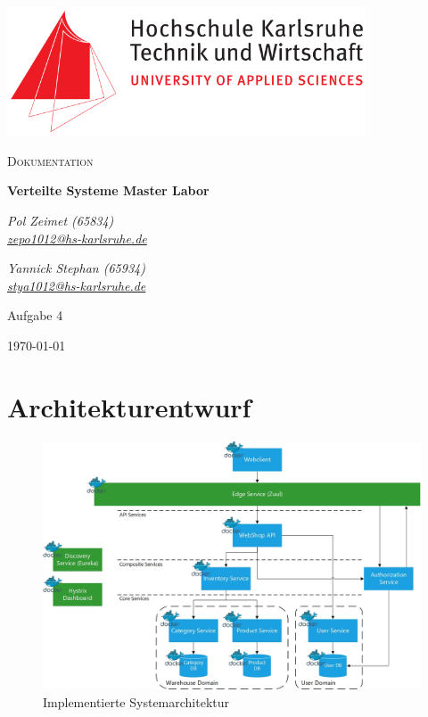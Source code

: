 \documentclass[12pt,a4paper]{article}
\begin{document}
	\begin{titlepage}
		\centering
		\includegraphics[width=0.8\textwidth]{img/Hska_logo.png}\par\vspace{1cm}
		{\scshape\LARGE Dokumentation\par}
		\vspace{1.5cm}
		{\huge\bfseries Verteilte Systeme Master Labor\par}
		\vspace{2cm}
		{\Large\itshape Pol Zeimet (65834) \\\href{mailto:zepo1012@hs-karlsruhe.de}{zepo1012@hs-karlsruhe.de}\par}
		\vfill
		{\Large\itshape Yannick Stephan (65934) \\\href{mailto:stya1012@hs-karlsruhe.de}{stya1012@hs-karlsruhe.de}\par}
		\vfill
		\large Aufgabe 4
		
		\vfill
		
		{\large \today\par}
	\end{titlepage}
	\section{Architekturentwurf}
	\label{sec:Architekturentwurf}	
		\begin{figure}[H]
			\centering
			\includegraphics[scale=0.55]{diagrams/architecture_v3.jpg}
			\caption{Implementierte Systemarchitektur}
			\label{fig:microservices-architecture}
		\end{figure}
\end{document}
